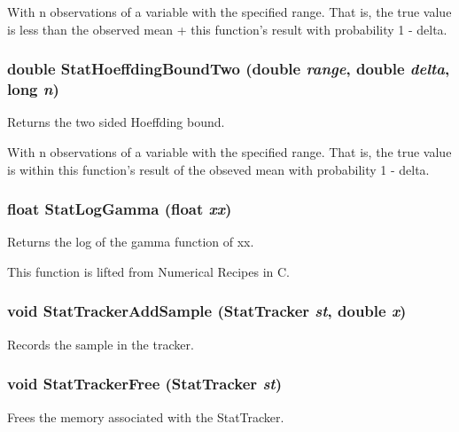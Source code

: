 With n observations of a variable with the specified range. That is, the true value is less than the observed mean + this function's result with probability 1 - delta. 
\subsubsection{\setlength{\rightskip}{0pt plus 5cm}double Stat\-Hoeffding\-Bound\-Two (double {\em range}, double {\em delta}, long {\em n})}\label{stats_8h_a12}


Returns the two sided Hoeffding bound. 

With n observations of a variable with the specified range. That is, the true value is within this function's result of the obseved mean with probability 1 - delta. 
\subsubsection{\setlength{\rightskip}{0pt plus 5cm}float Stat\-Log\-Gamma (float {\em xx})}\label{stats_8h_a13}


Returns the log of the gamma function of xx. 

This function is lifted from Numerical Recipes in C. 
\subsubsection{\setlength{\rightskip}{0pt plus 5cm}void Stat\-Tracker\-Add\-Sample ({\bf Stat\-Tracker} {\em st}, double {\em x})}\label{stats_8h_a4}


Records the sample in the tracker. 

\subsubsection{\setlength{\rightskip}{0pt plus 5cm}void Stat\-Tracker\-Free ({\bf Stat\-Tracker} {\em st})}\label{stats_8h_a3}


Frees the memory associated with the Stat\-Tracker. 

